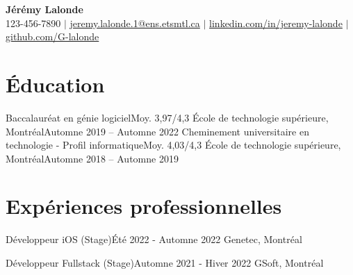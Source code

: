 \documentclass[letterpaper,11pt]{article}
\begin{document}
\begin{center}
  \textbf{\Huge J\'er\'emy Lalonde} \\ \vspace{5pt}
  \small 123-456-7890 $|$ \href{mailto:jeremy.lalonde.1@ens.etsmtl.ca}{jeremy.lalonde.1@ens.etsmtl.ca} $|$
  \href{https://linkedin.com/in/jeremy-lalonde}{linkedin.com/in/jeremy-lalonde} $|$
  \href{https://github.com/G-lalonde}{github.com/G-lalonde} \\ \vspace{3pt}
\end{center}

\section{\'Education}
\resumeSubHeadingListStart
\resumeSubheadingFour
{Baccalaur\'eat en g\'enie logiciel}{Moy. 3,97/4,3}
{\'Ecole de technologie sup\'erieure, Montr\'eal}{Automne 2019 -- Automne 2022}
\resumeSubheadingFour
{Cheminement universitaire en technologie - Profil informatique}{Moy. 4,03/4,3}
{\'Ecole de technologie sup\'erieure, Montr\'eal}{Automne 2018 -- Automne 2019}
\resumeSubHeadingListEnd

\vspace{1pt}
\section{Exp\'eriences professionnelles}
\resumeSubHeadingListStart

\resumeSubheadingThree
{D\'eveloppeur iOS (Stage)}{\'Et\'e 2022 - Automne 2022}
{Genetec, Montr\'eal}
\resumeItemListStart
{}
\resumeItemListEnd

\resumeSubheadingThree
{D\'eveloppeur Fullstack (Stage)}{Automne 2021 - Hiver 2022}
{GSoft, Montr\'eal}
\resumeItemListStart
{}
\resumeItemListEnd
\end{document}
